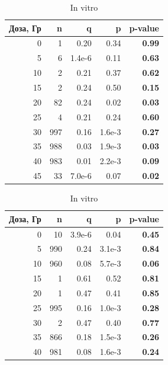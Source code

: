\documentclass[12pt, specialist, subf, substylefile = spbu_report.rtx]{disser}
\begin{document}
	\begin{table}[ht]
		\centering
		\caption*{Оценки параметров и значимости критерия хи-квадрат биномиально-логарифмического распределения.}
		\small
		\begin{minipage}{0.48\textwidth}
			\centering
			\caption{In vivo}
			
			\begin{tabular}{rrrrr}
				\hline
				Доза, Гр & n & q & p & \textbf{p-value} \\ 
				\hline
				0 & 1 & 0.20 & 0.34 & \textbf{0.99} \\ 
				5 & 6 & 1.4e-6 & 0.11 & \textbf{0.63} \\ 
				10 & 2 & 0.21 & 0.37 & \textbf{0.62} \\ 
				15 & 2 & 0.24 & 0.50 & \textbf{0.15} \\ 
				20 & 82 & 0.24 & 0.02 & \textbf{0.03} \\ 
				25 & 4 & 0.21 & 0.24 & \textbf{0.60} \\ 
				30 & 997 & 0.16 & 1.6e-3 & \textbf{0.27} \\ 
				35 & 988 & 0.03 & 1.9e-3 & \textbf{0.03} \\ 
				40 & 983 & 0.01 & 2.2e-3 & \textbf{0.09} \\
				45 & 33 & 7.0e-6 & 0.07 & \textbf{0.02} \\ 
				\hline
			\end{tabular}
			\label{tab:binomlogvivo}
		\end{minipage}
		\hfill
		\begin{minipage}{0.48\textwidth}
			\centering
			\caption{In vitro}
			
			\begin{tabular}{rrrrr}
				\hline
				Доза, Гр & n & q & p & \textbf{p-value} \\ 
				\hline
				0 & 10 & 3.9e-6 & 0.04 & \textbf{0.45} \\ 
				5 & 990 & 0.24 & 3.1e-3 & \textbf{0.84} \\ 
				10 & 960 & 0.08 & 5.7e-3 & \textbf{0.06} \\ 
				15 & 1 & 0.61 & 0.52 & \textbf{0.81} \\ 
				20 & 1 & 0.47 & 0.41 & \textbf{0.85} \\ 
				25 & 995 & 0.16 & 1.0e-3 & \textbf{0.28} \\ 
				30 & 2 & 0.47 & 0.40 & \textbf{0.77} \\ 
				35 & 866 & 0.18 & 1.5e-3 & \textbf{0.26} \\ 
				40 & 981 & 0.08 & 1.6e-3 & \textbf{0.24} \\
				\hline
			\end{tabular}
			\label{tab:binomlogvitro}
		\end{minipage}
		\label{tab:binomlog}
	\end{table}
\end{document}
